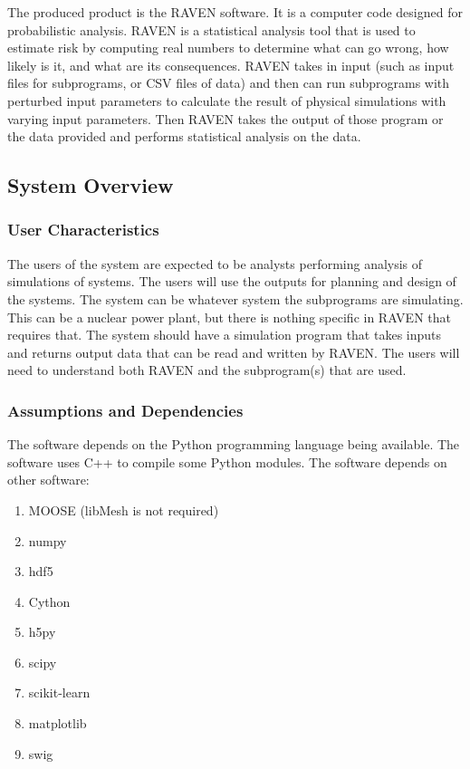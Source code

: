 \documentclass{article}
\begin{document}
The produced product is the RAVEN software.  It is a computer code
designed for probabilistic analysis.  RAVEN is a statistical analysis
tool that is used to estimate risk by computing real numbers to
determine what can go wrong, how likely is it, and what are its
consequences.  RAVEN takes in input (such as input files for
subprograms, or CSV files of data) and then can run subprograms with
perturbed input parameters to calculate the result of physical
simulations with varying input parameters.  Then RAVEN takes the
output of those program or the data provided and performs statistical
analysis on the data.

\subsection{System Overview}

\subsubsection{User Characteristics}

The users of the system are expected to be analysts performing
analysis of simulations of systems.  The users will use the outputs
for planning and design of the systems.  The system can be whatever
system the subprograms are simulating.  This can be a nuclear power
plant, but there is nothing specific in RAVEN that requires that.  The
system should have a simulation program that takes inputs and returns
output data that can be read and written by RAVEN.  The users will
need to understand both RAVEN and the subprogram(s) that are used.

\subsubsection{Assumptions and Dependencies}

The software depends on the Python programming language being
available.  The software uses C++ to compile some Python modules.  The
software depends on other software:

\begin{enumerate}
\item MOOSE (libMesh is not required)
\item numpy
\item hdf5
\item Cython
\item h5py
\item scipy
\item scikit-learn
\item matplotlib
\item swig
\end{enumerate}
\end{document}
